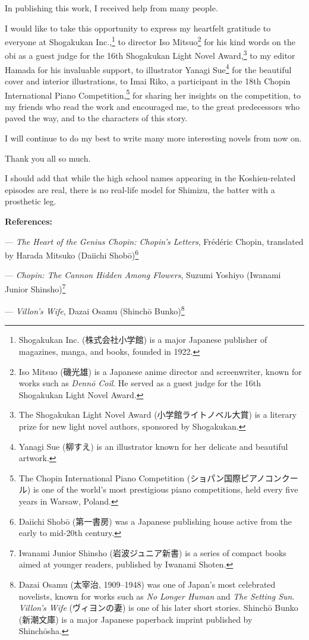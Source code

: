 \documentclass[
    a4paper,
    12pt,
    twoside,
    openany,
    UTF8,
    fontset=windows
]{ctexbook}
\begin{document}
In publishing this work, I received help from many people.

I would like to take this opportunity to express my heartfelt gratitude to everyone at Shogakukan Inc.,\footnote{Shogakukan Inc. (株式会社小学館) is a major Japanese publisher of magazines, manga, and books, founded in 1922.} to director Iso Mitsuo\footnote{Iso Mitsuo (磯光雄) is a Japanese anime director and screenwriter, known for works such as \textit{Dennō Coil}. He served as a guest judge for the 16th Shogakukan Light Novel Award.} for his kind words on the obi as a guest judge for the 16th Shogakukan Light Novel Award,\footnote{The Shogakukan Light Novel Award (小学館ライトノベル大賞) is a literary prize for new light novel authors, sponsored by Shogakukan.} to my editor Hamada for his invaluable support, to illustrator Yanagi Sue\footnote{Yanagi Sue (柳すえ) is an illustrator known for her delicate and beautiful artwork.} for the beautiful cover and interior illustrations, to Imai Riko, a participant in the 18th Chopin International Piano Competition,\footnote{The Chopin International Piano Competition (ショパン国際ピアノコンクール) is one of the world's most prestigious piano competitions, held every five years in Warsaw, Poland.} for sharing her insights on the competition, to my friends who read the work and encouraged me, to the great predecessors who paved the way, and to the characters of this story.

I will continue to do my best to write many more interesting novels from now on.

Thank you all so much.

I should add that while the high school names appearing in the Koshien-related episodes are real, there is no real-life model for Shimizu, the batter with a prosthetic leg.

\textbf{References:}

--- \textit{The Heart of the Genius Chopin: Chopin's Letters}, Frédéric Chopin, translated by Harada Mitsuko (Daiichi Shobō)\footnote{Daiichi Shobō (第一書房) was a Japanese publishing house active from the early to mid-20th century.}

--- \textit{Chopin: The Cannon Hidden Among Flowers}, Suzumi Yoshiyo (Iwanami Junior Shinsho)\footnote{Iwanami Junior Shinsho (岩波ジュニア新書) is a series of compact books aimed at younger readers, published by Iwanami Shoten.}

--- \textit{Villon's Wife}, Dazai Osamu (Shinchō Bunko)\footnote{Dazai Osamu (太宰治, 1909–1948) was one of Japan's most celebrated novelists, known for works such as \textit{No Longer Human} and \textit{The Setting Sun}. \textit{Villon's Wife} (ヴィヨンの妻) is one of his later short stories. Shinchō Bunko (新潮文庫) is a major Japanese paperback imprint published by Shinchōsha.}
\end{document}
